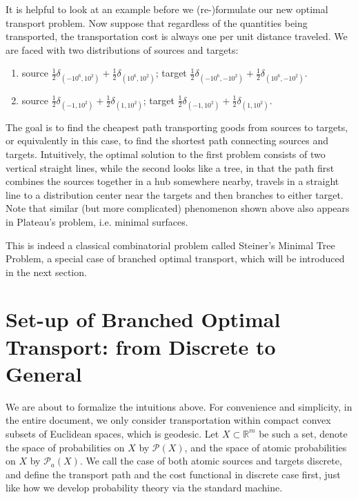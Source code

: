 \documentclass[fleqn]{article}
\theoremstyle{definition}
\theoremstyle{remark}
\renewcommand{\P}{\mathcal{P}} %
\begin{document}
\par
It is helpful to look at an example before we (re-)formulate our new optimal transport problem. Now suppose that regardless of the quantities being transported, the transportation cost is always one per unit distance traveled. We are faced with two distributions of sources and targets:
\begin{enumerate}
	\item source $\frac{1}{2}\delta_{(-10^6,10^2)}+ \frac{1}{2}\delta_{(10^6,10^2)}$;
		target $\frac{1}{2}\delta_{(-10^6,-10^2)}+ \frac{1}{2}\delta_{(10^6,-10^2)}$.
	\item source $\frac{1}{2}\delta_{(-1,10^2)}+ \frac{1}{2}\delta_{(1,10^2)}$;
		target $\frac{1}{2}\delta_{(-1,10^2)}+ \frac{1}{2}\delta_{(1,10^2)}$.
\end{enumerate}
The goal is to find the cheapest path transporting goods from sources to targets, or equivalently in this case, to find the shortest path connecting sources and targets.
Intuitively, the optimal solution to the first problem consists of two vertical straight lines, while the second looks like a tree, in that the path first combines the sources together in a hub somewhere nearby, travels in a straight line to a distribution center near the targets and then branches to either target. Note that similar (but more complicated) phenomenon shown above also appears in Plateau's problem, i.e. minimal surfaces.
\par
This is indeed a classical combinatorial problem called Steiner's Minimal Tree Problem, a special case of branched optimal transport, which will be introduced in the next section.



\section{Set-up of Branched Optimal Transport: from Discrete to General} \label{sec:setup}
We are about to formalize the intuitions above. For convenience and simplicity, in the entire document, we only consider transportation within compact convex subsets of Euclidean spaces, which is geodesic. Let $X \subset \mathbb{R}^m$ be such a set, denote the space of probabilities on $X$ by $\P(X)$, and the space of atomic probabilities on $X$ by $\P_a(X)$. We call the case of both atomic sources and targets discrete, and define the transport path and the cost functional in discrete case first, just like how we develop probability theory via the standard machine.
\end{document}
